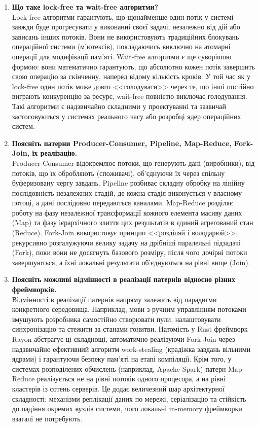\documentclass[14pt, a4paper]{extreport}
\begin{document}
\begin{enumerate}
		\item \textbf{Що таке lock-free та wait-free алгоритми?} \\ Lock-free алгоритми гарантують, що щонайменше один потік у системі завжди буде прогресувати у виконанні своєї задачі, незалежно від дій або зависань інших потоків. Вони не використовують традиційних блокувань операційної системи (м'ютексів), покладаючись виключно на атомарні операції для модифікації пам'яті. Wait-free алгоритми є ще суворішою формою: вони математично гарантують, що абсолютно кожен потік завершить свою операцію за скінченну, наперед відому кількість кроків. У той час як у lock-free один потік може довго <<голодувати>> через те, що інші постійно виграють конкуренцію за ресурс, wait-free повністю виключає голодування. Такі алгоритми є надзвичайно складними у проектуванні та зазвичай застосовуються у системах реального часу або розробці ядер операційних систем.
		
		\item \textbf{Поясніть патерни Producer-Consumer, Pipeline, Map-Reduce, Fork-Join, їх реалізацію.} \\ Producer-Consumer відокремлює потоки, що генерують дані (виробники), від потоків, що їх обробляють (споживачі), об'єднуючи їх через спільну буферизовану чергу завдань. Pipeline розбиває складну обробку на лінійну послідовність незалежних стадій, де кожна стадія виконується у власному потоці, а дані послідовно передаються каналами. Map-Reduce розділяє роботу на фазу незалежної трансформації кожного елемента масиву даних (Map) та фазу ієрархічного злиття цих результатів в єдиний агрегований стан (Reduce). Fork-Join використовує принцип <<розділяй і володарюй>>, рекурсивно розгалужуючи велику задачу на дрібніші паралельні підзадачі (Fork), поки вони не досягнуть базового розміру, після чого дочірні потоки завершуються, а їхні локальні результати об'єднуються на рівні вище (Join).
		
		\item \textbf{Поясніть можливі відмінності в реалізації патернів відносно різних фреймворків.} \\ Відмінності в реалізації патернів напряму залежать від парадигми конкретного середовища. Наприклад, мови з ручним управлінням потоками змушують розробника самостійно створювати пули, налаштовувати синхронізацію та стежити за станами гонитви. Натомість у Rust фреймворк Rayon абстрагує ці складнощі, автоматично реалізуючи Fork-Join через надзвичайно ефективний алгоритм work-stealing (крадіжка завдань вільними ядрами) і гарантуючи безпеку пам'яті на етапі компіляції. Крім того, у системах розподілених обчислень (наприклад, Apache Spark) патерн Map-Reduce реалізується не на рівні потоків одного процесора, а на рівні кластерів із сотень серверів. Це додає величезний шар архітектурної складності: механізми реплікації даних по мережі, серіалізацію та стійкість до падіння окремих вузлів системи, чого локальні in-memory фреймворки взагалі не потребують.
	\end{enumerate}
	
\end{document}
